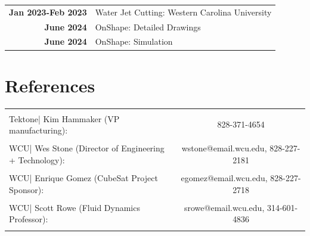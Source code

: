 \documentclass[allblack]{simplehipstercv}
\begin{document}
\begin{paracol}{2}
\begin{tabular}{>{\footnotesize\bfseries}r p{}}
    Jan 2023-Feb 2023 & Water Jet Cutting: Western Carolina University \\

    June 2024 & OnShape: Detailed Drawings \\

    June 2024 & OnShape: Simulation \\
\end{tabular}

\section*{References}
\begin{tabular}{l c}
    \hline & \\[0.5mm]
    Tektone| Kim Hammaker (VP manufacturing): & 828-371-4654\\[8pt]
    \hline & \\[0.5mm]
    WCU| Wes Stone (Director of Engineering + Technology): & wstone@email.wcu.edu, 828-227-2181\\[8pt]
    \hline & \\[0.5mm]
    WCU| Enrique Gomez (CubeSat Project Sponsor): & egomez@email.wcu.edu, 828-227-2718\\[8pt]
    \hline & \\[0.5mm]
    WCU| Scott Rowe (Fluid Dynamics Professor): & srowe@email.wcu.edu, 314-601-4836\\[8pt]
    \hline & \\[0.5mm]
\end{tabular}

\bigskip
\newpage

\end{paracol}
\end{document}
